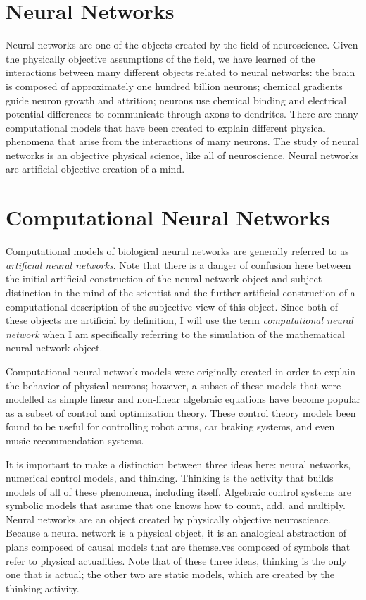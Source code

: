 \section{Neural Networks}

Neural networks are one of the objects created by the field of
neuroscience.  Given the physically objective assumptions of the
field, we have learned of the interactions between many different
objects related to neural networks: the brain is composed of
approximately one hundred billion neurons; chemical gradients guide
neuron growth and attrition; neurons use chemical binding and
electrical potential differences to communicate through axons to
dendrites.  There are many computational models that have been created
to explain different physical phenomena that arise from the
interactions of many neurons.  The study of neural networks is an
objective physical science, like all of neuroscience.  Neural networks
are artificial objective creation of a mind.

\section{Computational Neural Networks}

Computational models of biological neural networks are generally
referred to as \emph{artificial neural networks}.  Note that there is
a danger of confusion here between the initial artificial construction
of the neural network object and subject distinction in the mind of
the scientist and the further artificial construction of a
computational description of the subjective view of this object.
Since both of these objects are artificial by definition, I will use
the term \emph{computational neural network} when I am specifically
referring to the simulation of the mathematical neural network object.

Computational neural network models were originally created in order
to explain the behavior of physical neurons; however, a subset of
these models that were modelled as simple linear and non-linear
algebraic equations have become popular as a subset of control and
optimization theory.  These control theory models been found to be
useful for controlling robot arms, car braking systems, and even music
recommendation systems.

It is important to make a distinction between three ideas here: neural
networks, numerical control models, and thinking.  Thinking is the
activity that builds models of all of these phenomena, including
itself.  Algebraic control systems are symbolic models that assume
that one knows how to count, add, and multiply.  Neural networks are
an object created by physically objective neuroscience.  Because a
neural network is a physical object, it is an analogical abstraction
of plans composed of causal models that are themselves composed of
symbols that refer to physical actualities.  Note that of these three
ideas, thinking is the only one that is actual; the other two are
static models, which are created by the thinking activity.

